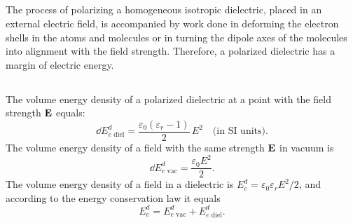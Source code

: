 \subsection{}\label{19.2.1}  The process of polarizing a homogeneous isotropic dielectric, placed in an external electric field, is accompanied by work done in deforming the electron shells in the atoms and molecules or in turning the dipole axes of the molecules into alignment with the field strength. Therefore, a polarized dielectric has a margin of electric energy.

\subsection{}\label{19.2.2}  The volume energy density of a polarized dielectric at a point with the field strength $\vb{E}$ equals:
\begin{equation*}%
\dd E_{e\,\, \text{diel}}^{d} = \frac{\varepsilon_{0}( \varepsilon_{r} -1)}{2} \, E^{2} \quad \text{(in SI units).}
\end{equation*}
The volume energy density of a field with the same strength $\vb{E}$ in vacuum is
\begin{equation*}%
\dd E_{e\,\, \text{vac}}^{d} = \frac{\varepsilon_{0}E^{2}}{2}.
\end{equation*}
The volume energy density of a field in a dielectric is $E_{e}^{d} = \varepsilon_{0}\varepsilon_{r}E^{2}/2$, and according to the energy conservation law it equals
\begin{equation*}%
 E_{e}^{d} = E_{e\,\, \text{vac}}^{d} + E_{e\,\, \text{diel}}^{d}.
\end{equation*}
